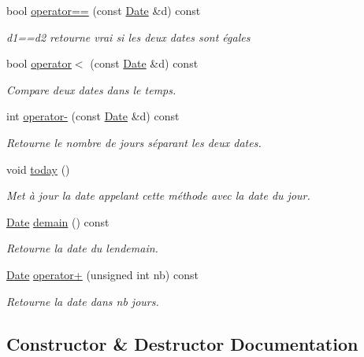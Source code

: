 \begin{DoxyCompactItemize}
bool \hyperlink{class_date_a16b90fa191e5d3080aa558fb29c676d2}{operator==} (const \hyperlink{class_date}{Date} \&d) const
\begin{DoxyCompactList}\small\item\em d1==d2 retourne vrai si les deux dates sont égales \end{DoxyCompactList}\item 
bool \hyperlink{class_date_a42bf31e1ff4d0cfcf71849876e670a1b}{operator$<$} (const \hyperlink{class_date}{Date} \&d) const
\begin{DoxyCompactList}\small\item\em Compare deux dates dans le temps. \end{DoxyCompactList}\item 
int \hyperlink{class_date_adcce792d461f182f9f3107e98029f8a8}{operator-\/} (const \hyperlink{class_date}{Date} \&d) const
\begin{DoxyCompactList}\small\item\em Retourne le nombre de jours séparant les deux dates. \end{DoxyCompactList}\item 
void \hyperlink{class_date_a4a148f744c00b74fff4ead1bed014d64}{today} ()
\begin{DoxyCompactList}\small\item\em Met à jour la date appelant cette méthode avec la date du jour. \end{DoxyCompactList}\item 
\hyperlink{class_date}{Date} \hyperlink{class_date_abed6f57b6368b738e37b6ad9a4c99879}{demain} () const
\begin{DoxyCompactList}\small\item\em Retourne la date du lendemain. \end{DoxyCompactList}\item 
\hyperlink{class_date}{Date} \hyperlink{class_date_ad5cfa3a4ad369bcbc59c0fbacd775fc5}{operator+} (unsigned int nb) const
\begin{DoxyCompactList}\small\item\em Retourne la date dans nb jours. \end{DoxyCompactList}\end{DoxyCompactItemize}


\subsection{Constructor \& Destructor Documentation}
\mbox{\label{class_date_afbee955665b0aeb1a62764c0984628ca}} 
